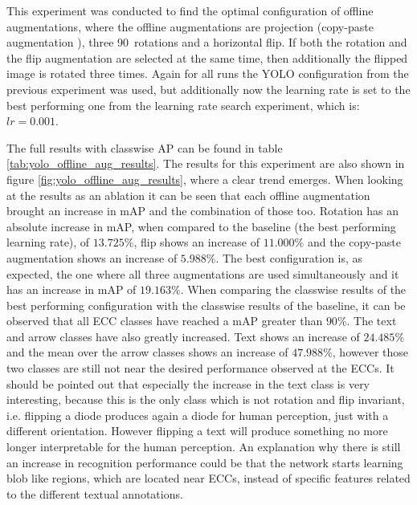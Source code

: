 This experiment was conducted to find the optimal configuration of offline augmentations, where the offline augmentations are projection (copy-paste augmentation \cite{copypaste_aug}), three 90\textdegree\ rotations and a horizontal flip.
If both the rotation and the flip augmentation are selected at the same time, then additionally the flipped image is rotated three times.
Again for all runs the YOLO configuration from the previous experiment was used, but additionally now the learning rate is set to the best performing one from the learning rate search experiment, which is: $lr = 0.001$.


The full results with classwise \ac{AP} can be found in table \ref{tab:yolo_offline_aug_results}.
The results for this experiment are also shown in figure \ref{fig:yolo_offline_aug_results}, where a clear trend emerges.
When looking at the results as an ablation it can be seen that each offline augmentation brought an increase in \ac{mAP} and the combination of those too.
Rotation has an absolute increase in mAP, when compared to the baseline (the best performing learning rate), of $13.725\%$, flip shows an increase of $11.000\%$ and the copy-paste augmentation shows an increase of $5.988\%$.
The best configuration is, as expected, the one where all three augmentations are used simultaneously and it has an increase in \ac{mAP} of $19.163\%$.
When comparing the classwise results of the best performing configuration with the classwise results of the baseline, it can be observed that all \ac{ECC} classes have reached a \ac{mAP} greater than $90\%$.
The text and arrow classes have also greatly increased.
Text shows an increase of $24.485\%$ and the mean over the arrow classes shows an increase of $47.988\%$, however those two classes are still not near the desired performance observed at the \acp{ECC}.
It should be pointed out that especially the increase in the text class is very interesting, because this is the only class which is not rotation and flip invariant, i.e. flipping a diode produces again a diode for human perception, just with a different orientation.
However flipping a text will produce something no more longer interpretable for the human perception.
An explanation why there is still an increase in recognition performance could be that the network starts learning blob like regions, which are located near \acp{ECC}, instead of specific features related to the different textual annotations.

